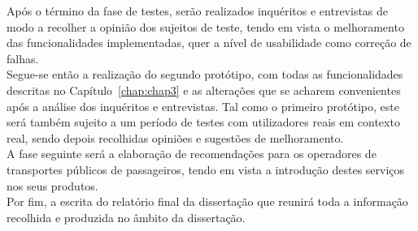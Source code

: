 Após o término da fase de testes, serão realizados inquéritos e entrevistas de modo a recolher a opinião dos sujeitos de teste, tendo em vista o melhoramento das funcionalidades implementadas, quer a nível de usabilidade como correção de falhas.
\\Segue-se então a realização do segundo protótipo, com todas as funcionalidades descritas no Capítulo~\ref{chap:chap3} e as alterações que se acharem convenientes após a análise dos inquéritos e entrevistas. Tal como o primeiro protótipo, este será também sujeito a um período de testes com utilizadores reais em contexto real, sendo depois recolhidas opiniões e sugestões de melhoramento.
\\A fase seguinte será a elaboração de recomendações para os operadores de transportes públicos de passageiros, tendo em vista a introdução destes serviços nos seus produtos.
\\Por fim, a escrita do relatório final da dissertação que reunirá toda a informação recolhida e produzida no âmbito da dissertação.